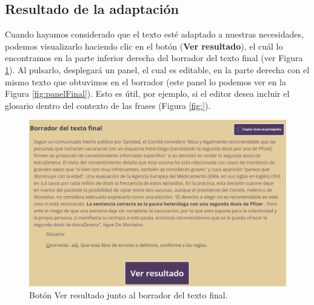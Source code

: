 \subsection{Resultado de la adaptación}
 
Cuando hayamos considerado que el texto esté adaptado a nuestras necesidades, podemos visualizarlo haciendo clic en el botón (\textbf{Ver resultado}), el cuál lo encontramos en la parte inferior derecha del borrador del texto final (ver Figura \ref{fig:botonResultado}). Al pulsarlo, desplegará un panel, el cual es editable, en la parte derecha con el mismo texto que obtuvimos en el borrador (este panel lo podemos ver en la Figura \ref{fig:panelFinal}). Esto es útil, por ejemplo, si el editor desea incluir el glosario dentro del contexto de las frases (Figura \ref{fig:}). 
\begin{figure}[h!]
	\centering
	
	
	\includegraphics[scale=0.8]{Imagenes/Figuras/verResultado}
	
	
	\caption{Botón Ver resultado junto al borrador del texto final.}
	\label{fig:botonResultado}
\end{figure}
